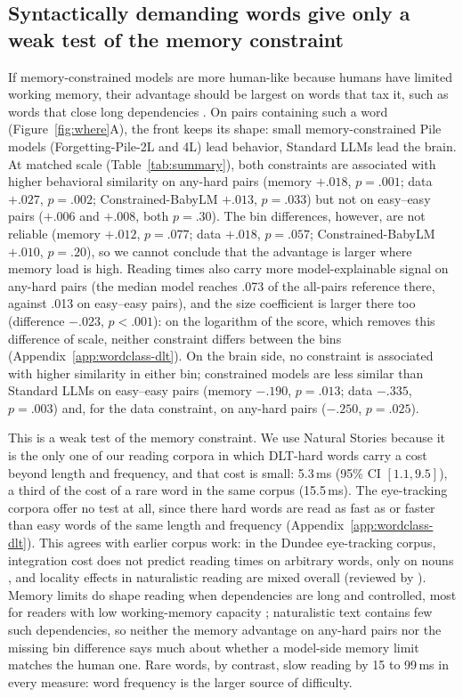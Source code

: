 \subsection{Syntactically demanding words give only a weak test of the memory constraint}
\label{sec:results-dlt}

If memory-constrained models are more human-like because humans have limited working memory, their advantage should be largest on words that tax it, such as words that close long dependencies \citep{gibson2000dlt}. On pairs containing such a word (Figure~\ref{fig:where}A), the front keeps its shape: small memory-constrained Pile models (Forgetting-Pile-2L and 4L) lead behavior, Standard LLMs lead the brain. At matched scale (Table~\ref{tab:summary}), both constraints are associated with higher behavioral similarity on any-hard pairs (memory $+.018$, $p=.001$; data $+.027$, $p=.002$; Constrained-BabyLM $+.013$, $p=.033$) but not on easy--easy pairs ($+.006$ and $+.008$, both $p=.30$). The bin differences, however, are not reliable (memory $+.012$, $p=.077$; data $+.018$, $p=.057$; Constrained-BabyLM $+.010$, $p=.20$), so we cannot conclude that the advantage is larger where memory load is high. Reading times also carry more model-explainable signal on any-hard pairs (the median model reaches .073 of the all-pairs reference there, against .013 on easy--easy pairs), and the size coefficient is larger there too (difference $-.023$, $p<.001$): on the logarithm of the score, which removes this difference of scale, neither constraint differs between the bins (Appendix~\ref{app:wordclass-dlt}). On the brain side, no constraint is associated with higher similarity in either bin; constrained models are less similar than Standard LLMs on easy--easy pairs (memory $-.190$, $p=.013$; data $-.335$, $p=.003$) and, for the data constraint, on any-hard pairs ($-.250$, $p=.025$).

This is a weak test of the memory constraint. We use Natural Stories because it is the only one of our reading corpora in which DLT-hard words carry a cost beyond length and frequency, and that cost is small: 5.3\,ms (95\% CI $[1.1, 9.5]$), a third of the cost of a rare word in the same corpus (15.5\,ms). The eye-tracking corpora offer no test at all, since there hard words are read as fast as or faster than easy words of the same length and frequency (Appendix~\ref{app:wordclass-dlt}). This agrees with earlier corpus work: in the Dundee eye-tracking corpus, integration cost does not predict reading times on arbitrary words, only on nouns \citep{demberg2008data}, and locality effects in naturalistic reading are mixed overall (reviewed by \citealp{li2027modeling}). Memory limits do shape reading when dependencies are long and controlled, most for readers with low working-memory capacity \citep{li2027modeling}; naturalistic text contains few such dependencies, so neither the memory advantage on any-hard pairs nor the missing bin difference says much about whether a model-side memory limit matches the human one. Rare words, by contrast, slow reading by 15 to 99\,ms in every measure: word frequency is the larger source of difficulty.

